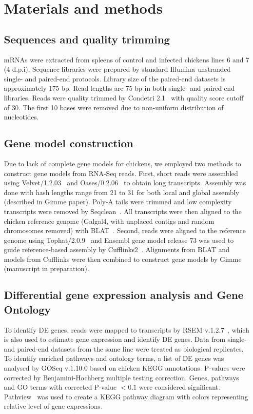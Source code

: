 \section{Materials and methods}

\subsection{Sequences and quality trimming}

mRNAs were extracted from spleens of control and infected
chickens lines 6 and 7 (4 d.p.i).  Sequence libraries were
prepared by standard Illumina unstranded single- and paired-end
protocols.  Library size of the paired-end datasets is
approximately 175 bp.  Read lengths are 75 bp in both single- and
paired-end libraries.  Reads were quality trimmed by Condetri
2.1~\cite{smeds2011condetri} with quality score cutoff of 30.
The first 10 bases were removed due to non-uniform distribution
of nucleotides.

\subsection{Gene model construction}

Due to lack of complete gene models for chickens, we employed two
methods to construct gene models from RNA-Seq reads.  First,
short reads were assembled using
Velvet/1.2.03~\cite{Zerbino:2008vu} and
Oases/0.2.06~\cite{Schulz:2012je} to obtain long transcripts.
Assembly was done with hash lengths range from 21 to 31 for both
local and global assembly (described in Gimme paper).  Poly-A
tails were trimmed and low complexity transcripts were removed by
Seqclean~\cite{seqclean}.  All transcripts were then aligned to
the chicken reference genome (Galgal4, with unplaced contigs and random
chromosomes removed) with BLAT~\cite{Kent:2002tv}.  Second, reads
were aligned to the reference genome using
Tophat/2.0.9~\cite{Trapnell:2009dp} and Ensembl gene model
release 73 was used to guide reference-based assembly by
Cufflinks2~\cite{Trapnell:2010kd}.  Alignments from BLAT and
models from Cufflinks were then combined to construct gene models
by Gimme (manuscript in preparation).

\subsection{Differential gene expression analysis and Gene
Ontology}

To identify DE genes, reads were mapped to transcripts by RSEM
v.1.2.7~\cite{li2011rsem}, which is also used to estimate gene
expression and identify DE genes.  Data from single- and
paired-end datasets from the same line were treated as biological
replicates.  To identify enriched pathways and ontology terms, a
list of DE genes was analysed by GOSeq v.1.10.0 based on chicken
KEGG annotations.  P-values were corrected by
Benjamini-Hochberg multiple testing correction.  Genes, pathways
and GO terms with corrected P-value $<0.1$ were considered
significant.  Pathview~\cite{luo2013pathview} was used to create
a KEGG pathway diagram with colors representing relative level of
gene expressions.

